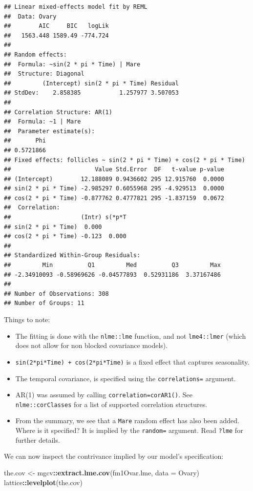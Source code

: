 \documentclass[]{book}
\newenvironment{Shaded}{\begin{snugshade}}{\end{snugshade}}
\newcommand{\DataTypeTok}[1]{\textcolor[rgb]{0.13,0.29,0.53}{#1}}
\newcommand{\KeywordTok}[1]{\textcolor[rgb]{0.13,0.29,0.53}{\textbf{#1}}}
\newcommand{\NormalTok}[1]{#1}
\newcommand{\OperatorTok}[1]{\textcolor[rgb]{0.81,0.36,0.00}{\textbf{#1}}}
\newcommand{\StringTok}[1]{\textcolor[rgb]{0.31,0.60,0.02}{#1}}
\providecommand{\tightlist}{%
  \setlength{\itemsep}{0pt}\setlength{\parskip}{0pt}}
\theoremstyle{definition}
\theoremstyle{definition}
\theoremstyle{definition}
\theoremstyle{remark}
\begin{document}
\begin{verbatim}
## Linear mixed-effects model fit by REML
##  Data: Ovary 
##        AIC     BIC   logLik
##   1563.448 1589.49 -774.724
## 
## Random effects:
##  Formula: ~sin(2 * pi * Time) | Mare
##  Structure: Diagonal
##         (Intercept) sin(2 * pi * Time) Residual
## StdDev:    2.858385           1.257977 3.507053
## 
## Correlation Structure: AR(1)
##  Formula: ~1 | Mare 
##  Parameter estimate(s):
##       Phi 
## 0.5721866 
## Fixed effects: follicles ~ sin(2 * pi * Time) + cos(2 * pi * Time) 
##                        Value Std.Error  DF   t-value p-value
## (Intercept)        12.188089 0.9436602 295 12.915760  0.0000
## sin(2 * pi * Time) -2.985297 0.6055968 295 -4.929513  0.0000
## cos(2 * pi * Time) -0.877762 0.4777821 295 -1.837159  0.0672
##  Correlation: 
##                    (Intr) s(*p*T
## sin(2 * pi * Time)  0.000       
## cos(2 * pi * Time) -0.123  0.000
## 
## Standardized Within-Group Residuals:
##         Min          Q1         Med          Q3         Max 
## -2.34910093 -0.58969626 -0.04577893  0.52931186  3.37167486 
## 
## Number of Observations: 308
## Number of Groups: 11
\end{verbatim}

Things to note:

\begin{itemize}
\tightlist
\item
  The fitting is done with the \texttt{nlme::lme} function, and not \texttt{lme4::lmer} (which does not allow for non blocked covariance models).
\item
  \texttt{sin(2*pi*Time)\ +\ cos(2*pi*Time)} is a fixed effect that captures seasonality.
\item
  The temporal covariance, is specified using the \texttt{correlations=} argument.
\item
  AR(1) was assumed by calling \texttt{correlation=corAR1()}. See \texttt{nlme::corClasses} for a list of supported correlation structures.
\item
  From the summary, we see that a \texttt{Mare} random effect has also been added. Where is it specified? It is implied by the \texttt{random=} argument. Read \texttt{?lme} for further details.
\end{itemize}

We can now inspect the contrivance implied by our model's specification:

\begin{Shaded}
\begin{Highlighting}[]
\NormalTok{the.cov <-}\StringTok{ }\NormalTok{mgcv}\OperatorTok{::}\KeywordTok{extract.lme.cov}\NormalTok{(fm1Ovar.lme, }\DataTypeTok{data =}\NormalTok{ Ovary) }
\NormalTok{lattice}\OperatorTok{::}\KeywordTok{levelplot}\NormalTok{(the.cov)}
\end{Highlighting}
\end{Shaded}
\end{document}
